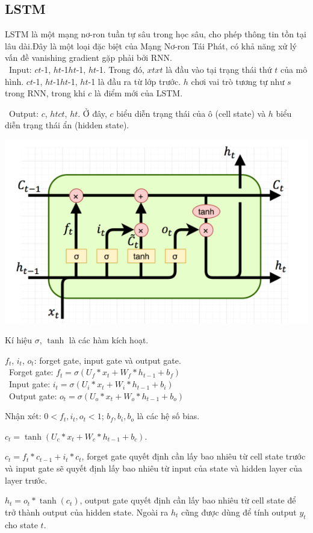 \subsection{LSTM}
LSTM là một mạng nơ-ron tuần tự sâu trong học sâu, cho phép thông tin tồn tại lâu dài.Đây là một loại đặc biệt của Mạng Nơ-ron Tái Phát, có khả năng xử lý vấn đề vanishing gradient gặp phải bởi RNN.\\
\indent\textbullet\ Input: \(ct\)-1, \(ht\)-1\(ht\)-1, \(ht\)-1. Trong đó, \(xtxt\) là đầu vào tại trạng thái thứ \(t\) của mô hình. \(ct\)-1, \(ht\)-1\(ht\)-1, \(ht\)-1 là đầu ra từ lớp trước. \(h\) chơi vai trò tương tự như \(s\) trong RNN, trong khi \(c\) là điểm mới của LSTM.

\indent\textbullet\ Output: \(c\), \(htct\), \(ht\). Ở đây, \(c\) biểu diễn trạng thái của ô (cell state) và \(h\) biểu diễn trạng thái ẩn (hidden state).

\begin{minipage}{0.5\textwidth}
\centering
\includegraphics[width=1\textwidth]{resources/chapter-4/lstm-1.png}
\end{minipage}

Kí hiệu \(\sigma\), \(\tanh\) là các hàm kích hoạt.
\par
\( f_t \), \( i_t \), \( o_t \): forget gate, input gate và output gate.\\
    \indent\textbullet\ Forget gate: \( f_t = \sigma\left(U_f \ast x_t + W_f \ast h_{t-1} + b_f\right) \)\\
    \indent\textbullet\ Input gate: \( i_t = \sigma\left(U_i \ast x_t + W_i \ast h_{t-1} + b_i\right) \)\\
    \indent\textbullet\ Output gate: \( o_t = \sigma\left(U_o \ast x_t + W_o \ast h_{t-1} + b_o\right) \)
\par
Nhận xét: \( 0 < f_t, i_t, o_t < 1 \); \( b_f, b_i, b_o \) là các hệ số bias.
\par
\( c_t = \tanh\left(U_c \ast x_t + W_c \ast h_{t-1} + b_c\right) \).
\par
\( c_t = f_t \ast c_{t-1} + i_t \ast c_t \), forget gate quyết định cần lấy bao nhiêu từ cell state trước và input gate sẽ quyết định lấy bao nhiêu từ input của state và hidden layer của layer trước.
\par
\( h_t = o_t \ast \tanh\left(c_t\right) \), output gate quyết định cần lấy bao nhiêu từ cell state để trở thành output của hidden state. Ngoài ra \( h_t \) cũng được dùng để tính output \( y_t \) cho state \( t \).

